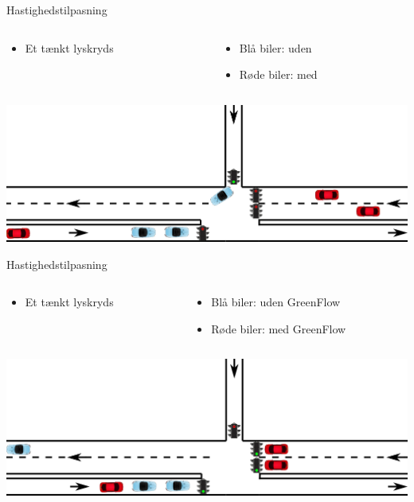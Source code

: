 \begin{frame}{Hastighedstilpasning}
\begin{columns}
\begin{column}{0.4\textwidth}
\begin{itemize}
\item Et tænkt lyskryds
\end{itemize}

\vspace{5mm}
\end{column}
\begin{column}{0.6\textwidth}
\begin{itemize}
\item Blå biler: uden \tech
\item Røde biler: med \tech
\end{itemize}
\end{column}
\end{columns}

\vspace{3mm}
\includegraphics[width=1\textwidth]{../images/introNetworkSimple.png}
\end{frame}

\begin{frame}{Hastighedstilpasning}
\begin{columns}
\begin{column}{0.4\textwidth}
\begin{itemize}
\item Et tænkt lyskryds
\end{itemize}

\vspace{5mm}
\end{column}
\begin{column}{0.6\textwidth}
\begin{itemize}
\item Blå biler: uden GreenFlow
\item Røde biler: med GreenFlow
\end{itemize}
\end{column}
\end{columns}
\vspace{3mm}
\includegraphics[width=1\textwidth]{../images/introNetworkSimple2.png}
\end{frame}

